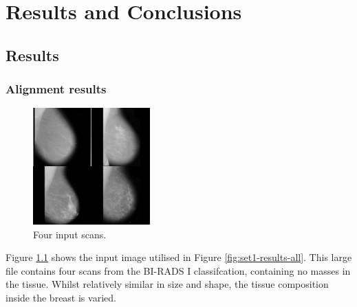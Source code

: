 \chapter{Results and Conclusions}




\section{Results}

\subsection{Alignment results}

\begin{figure}[H]
  \centering
  \includegraphics[width=0.4\textwidth]{Chapter3/results-img/big_scan.png}
  \caption{Four input scans.}
  \label{fig:input-data}
\end{figure}

Figure \ref{fig:input-data} shows the input image utilised in Figure \ref{fig:set1-results-all}. This large file contains four scans from the BI-RADS I classifcation, containing no masses in the tissue. Whilst relatively similar in size and shape, the tissue composition inside the breast is varied.

